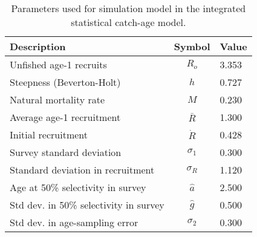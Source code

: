 \documentclass[review,letterpaper,10pt,authoryear]{elsarticle}
\begin{document}
\begin{table}[!tbh]
	\caption{Parameters used for simulation model in the integrated statistical catch-age model.}
	\label{table:simulationpars}
	\begin{center}
		\begin{tabular}{l|cl}
		\hline

		\hline
		\textbf{Description} & \textbf{Symbol} & \textbf{Value} \\
		\hline	
			 Unfished age-1 recruits 			& $R_o$ 	 & 3.353 \\
			 Steepness (Beverton-Holt) 			& $h$ 		 & 0.727 \\
			 Natural mortality rate 			& $M$		 & 0.230 \\
			 Average age-1 recruitment			& $\bar{R}$	 & 1.300 \\
			 Initial recruitment 				& $\dot{R}$  & 0.428 \\
			 Survey standard deviation 	   		& $\sigma_1$ & 0.300 \\
			 Standard deviation in recruitment	& $\sigma_R$ & 1.120 \\
			 Age at 50\% selectivity in survey  & $\hat{a}$  & 2.500 \\
			 Std dev. in 50\% selectivity in survey  & $\hat{g}$  & 0.500 \\
			 Std dev. in age-sampling error          & $\sigma_2$ & 0.300\\
		\hline

		\hline
		\end{tabular}
	\end{center}
\end{table}


\end{document}
